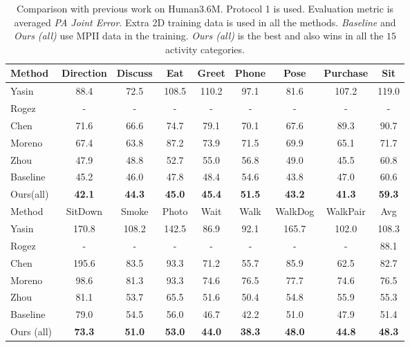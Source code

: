 \documentclass[10pt,twocolumn,letterpaper]{article}
\begin{document}
\begin{table*}
\centering
\small
\begin{tabular}{l|c|c|c|c|c|c|c|c}
\hline
Method & Direction 	& Discuss & Eat &Greet 	& Phone & Pose 	& Purchase	& Sit	 \\
\hline \hline
Yasin\cite{yasin2016dual} & 88.4 & 72.5 & 108.5 & 110.2 & 97.1 & 81.6 & 107.2 & 119.0  \\
Rogez\cite{rogez2016mocap}& - & - & - & - & - & - & - & - \\
Chen\cite{chen20163d} & 71.6 & 66.6 & 74.7 & 79.1 & 70.1 & 67.6 & 89.3 & 90.7 \\
Moreno\cite{moreno20163d}& 67.4 & 63.8 & 87.2 & 73.9 & 71.5 & 69.9 & 65.1 & 71.7  \\
Zhou\cite{zhou2017monocap}& 47.9 & 48.8 & 52.7 & 55.0 & 56.8 & 49.0 & 45.5 & 60.8  \\
\hline
Baseline  & 45.2 & 46.0 & 47.8 & 48.4 & 54.6 & 43.8 & 47.0 & 60.6 \\
Ours(all)  & \textbf{42.1} & \textbf{44.3} & \textbf{45.0} & \textbf{45.4} & \textbf{51.5} & \textbf{43.2} & \textbf{41.3} & \textbf{59.3} \\
\hline \hline
Method & SitDown& Smoke 		& Photo   & Wait&Walk 	&WalkDog&WalkPair& Avg  \\
Yasin\cite{yasin2016dual} & 170.8 & 108.2 & 142.5 & 86.9 & 92.1 & 165.7 & 102.0 & 108.3 \\
Rogez\cite{rogez2016mocap}& - & - & - & - & - & - & - & 88.1 \\
Chen\cite{chen20163d} & 195.6& 83.5 & 93.3 & 71.2 & 55.7 & 85.9 & 62.5 & 82.7 \\
Moreno\cite{moreno20163d}& 98.6& 81.3 & 93.3 & 74.6 & 76.5 & 77.7 & 74.6 & 76.5  \\
Zhou\cite{zhou2017monocap}& 81.1& 53.7 & 65.5 & 51.6 & 50.4 & 54.8 & 55.9 & 55.3  \\
\hline
Baseline & 79.0& 54.5 & 56.0 & 46.7 & 42.2 & 51.0 & 47.9 & 51.4 \\
Ours (all)  & \textbf{73.3} & \textbf{51.0} & \textbf{53.0} & \textbf{44.0} & \textbf{38.3} & \textbf{48.0} & \textbf{44.8} & \textbf{48.3} \\
\end{tabular}
\caption{Comparison with previous work on Human3.6M. Protocol 1 is used. Evaluation metric is averaged \emph{PA Joint Error}. Extra 2D training data is used in all the methods. \emph{Baseline} and \emph{Ours (all)} use MPII data in the training. \emph{Ours (all)} is the best and also wins in all the $15$ activity categories.}
\label{table:hm36_p1_use_mpii}
\end{table*}
\end{document}
